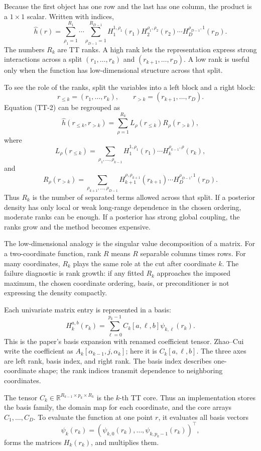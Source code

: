\documentclass[11pt]{article}
\newcommand{\R}{\mathbb R}
\begin{document}
Because the first object has one row and the last has one column, the product is
a \(1\times 1\) scalar.  Written with indices,
\[
    \widehat h(r)
    =
    \sum_{\rho_1=1}^{R_1}\cdots
    \sum_{\rho_{D-1}=1}^{R_{D-1}}
    H_1^{1,\rho_1}(r_1)
    H_2^{\rho_1,\rho_2}(r_2)\cdots
    H_D^{\rho_{D-1},1}(r_D).
    \tag{TT-2}
\]
The numbers \(R_k\) are TT ranks.  A high rank lets the representation express
strong interactions across a split \((r_1,\ldots,r_k)\) and
\((r_{k+1},\ldots,r_D)\).  A low rank is useful only when the function has
low-dimensional structure across that split.

To see the role of the ranks, split the variables into a left block and a right
block:
\[
    r_{\le k}=(r_1,\ldots,r_k),\qquad
    r_{>k}=(r_{k+1},\ldots,r_D).
\]
Equation (TT-2) can be regrouped as
\[
    \widehat h(r_{\le k},r_{>k})
    =
    \sum_{\rho=1}^{R_k}
    L_\rho(r_{\le k})R_\rho(r_{>k}),
    \tag{TT-2a}
\]
where
\[
    L_\rho(r_{\le k})
    =
    \sum_{\rho_1,\ldots,\rho_{k-1}}
    H_1^{1,\rho_1}(r_1)\cdots H_k^{\rho_{k-1},\rho}(r_k),
\]
and
\[
    R_\rho(r_{>k})
    =
    \sum_{\rho_{k+1},\ldots,\rho_{D-1}}
    H_{k+1}^{\rho,\rho_{k+1}}(r_{k+1})\cdots
    H_D^{\rho_{D-1},1}(r_D).
\]
Thus \(R_k\) is the number of separated terms allowed across that split.  If a
posterior density has only local or weak long-range dependence in the chosen
ordering, moderate ranks can be enough.  If a posterior has strong global
coupling, the ranks grow and the method becomes expensive.

The low-dimensional analogy is the singular value decomposition of a matrix.
For a two-coordinate function, rank \(R\) means \(R\) separable columns times
rows.  For many coordinates, \(R_k\) plays the same role at the cut after
coordinate \(k\).  The failure diagnostic is rank growth: if any fitted
\(R_k\) approaches the imposed maximum, the chosen coordinate ordering, basis,
or preconditioner is not expressing the density compactly.

Each univariate matrix entry is represented in a basis:
\[
    H_k^{a,b}(r_k)
    =
    \sum_{\ell=0}^{p_k-1}
    C_k[a,\ell,b]\psi_{k,\ell}(r_k).
    \tag{TT-3}
\]
This is the paper's basis expansion with renamed coefficient tensor.  Zhao--Cui
write the coefficient as \(A_k[\alpha_{k-1},j,\alpha_k]\); here it is
\(C_k[a,\ell,b]\).  The three axes are left rank, basis index, and right rank.
The basis index describes one-coordinate shape; the rank indices transmit
dependence to neighboring coordinates.

The tensor \(C_k\in\R^{R_{k-1}\times p_k\times R_k}\) is the \(k\)-th TT core.
Thus an implementation stores the basis family, the domain map for each
coordinate, and the core arrays \(C_1,\ldots,C_D\).  To evaluate the function at
one point \(r\), it evaluates all basis vectors
\[
    \psi_k(r_k)
    =
    (\psi_{k,0}(r_k),\ldots,\psi_{k,p_k-1}(r_k))^\top,
\]
forms the matrices \(H_k(r_k)\), and multiplies them.
\end{document}
